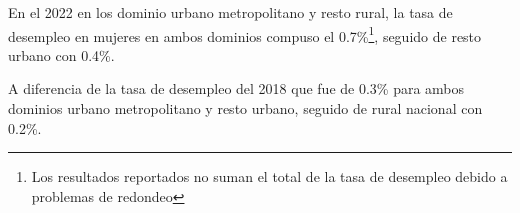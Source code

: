 En el 2022 en los dominio urbano metropolitano y resto rural, la tasa de desempleo en mujeres en ambos dominios compuso el 0.7\%\footnote{Los resultados reportados no suman el total de la tasa de desempleo debido a problemas de redondeo}, seguido de resto urbano con 0.4\%.

A diferencia de la tasa de desempleo del 2018 que fue de 0.3\% para ambos dominios urbano metropolitano y resto urbano, seguido de rural nacional con 0.2\%. 
